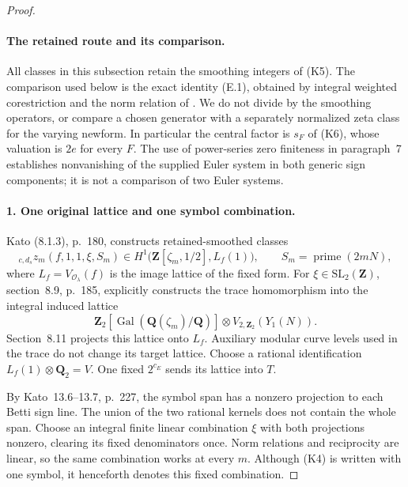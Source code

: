 \documentclass[11pt]{article}
\theoremstyle{definition}
\theoremstyle{remark}
\begin{document}
\begin{proof}\leavevmode
\paragraph{The retained route and its comparison.}
All classes in this subsection retain the smoothing integers of (K5).
The comparison used below is the exact identity (E.1), obtained by
integral weighted corestriction and the norm relation of
\cite[Proposition 8.12]{kato}. We do not divide by the smoothing
operators, or compare a chosen generator with a separately normalized
zeta class for the varying newform. In particular the central factor
is $s_F$ of (K6), whose valuation is $2e$ for every $F$.
The use of power-series zero finiteness in paragraph~7 establishes
nonvanishing of the supplied Euler system in both generic sign
components; it is not a comparison of two Euler systems.

\paragraph{1. One original lattice and one symbol combination.}
Kato (8.1.3), p.~180, constructs retained-smoothed classes
\[
 {}_{c,d_s}z_m(f,1,1,\xi,S_m)
 \in H^1\bigl(\mathbf Z[\zeta_m,1/2],L_f(1)\bigr),
 \qquad S_m=\operatorname{prime}(2mN),                      \tag{K4}
\]
where $L_f=V_{\mathcal O_\lambda}(f)$ is the image lattice of the
fixed form. For $\xi\in\mathrm{SL}_2(\mathbf Z)$, section~8.9,
p.~185, explicitly constructs the trace homomorphism into the
integral induced lattice
\[
 \mathbf Z_2[\operatorname{Gal}(\mathbf Q(\zeta_m)/\mathbf Q)]
       \otimes V_{2,\mathbf Z_2}(Y_1(N)).
\]
Section~8.11 projects this lattice onto $L_f$. Auxiliary modular
curve levels used in the trace do not change its target lattice.
Choose a rational identification $L_f(1)\otimes\mathbf Q_2=V$.
One fixed $2^{c_E}$ sends its lattice into $T$.

By Kato~13.6--13.7, p.~227, the symbol span has a nonzero projection
to each Betti sign line. The union of the two rational kernels does
not contain the whole span. Choose an integral finite linear
combination $\xi$ with both projections nonzero, clearing its fixed
denominators once. Norm relations and reciprocity are linear, so
the same combination works at every $m$. Although (K4) is written
with one symbol, it henceforth denotes this fixed combination.


\end{proof}
\end{document}
